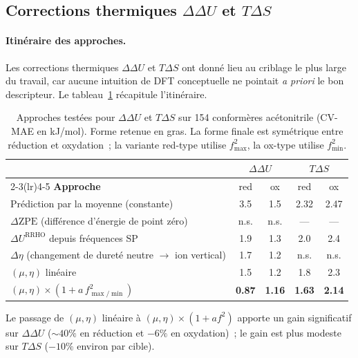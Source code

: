 \subsection{Corrections thermiques \texorpdfstring{$\Delta\Delta U$}{ddU} et \texorpdfstring{$T\Delta S$}{TdS}}
\label{app:thermal_search}

\paragraph{Itinéraire des approches.}
Les corrections thermiques $\Delta\Delta U$ et $T\Delta S$ ont donné lieu au criblage le plus large du travail, car aucune intuition de DFT conceptuelle ne pointait \emph{a priori} le bon descripteur. Le tableau~\ref{tab:app_thermal_journey} récapitule l'itinéraire.

\begin{table}[H]
\centering
\caption{Approches testées pour $\Delta\Delta U$ et $T\Delta S$ sur 154 conformères acétonitrile (CV-MAE en kJ/mol). Forme retenue en gras. La forme finale est symétrique entre réduction et oxydation~; la variante red-type utilise $f^2_{\max}$, la ox-type utilise $f^2_{\min}$.}
\label{tab:app_thermal_journey}
\footnotesize
\begin{tabular}{l c c c c}
\toprule
 & \multicolumn{2}{c}{$\Delta\Delta U$} & \multicolumn{2}{c}{$T\Delta S$} \\
\cmidrule(lr){2-3}\cmidrule(lr){4-5}
\textbf{Approche} & red & ox & red & ox \\
\midrule
Prédiction par la moyenne (constante) & 3.5 & 1.5 & 2.32 & 2.47 \\
$\Delta\text{ZPE}$ (différence d'énergie de point zéro) & n.s. & n.s. & --- & --- \\
$\Delta U^\text{RRHO}$ depuis fréquences SP & 1.9 & 1.3 & 2.0 & 2.4 \\
$\Delta\eta$ (changement de dureté neutre $\to$ ion vertical) & 1.7 & 1.2 & n.s. & n.s. \\
$(\mu, \eta)$ linéaire & 1.5 & 1.2 & 1.8 & 2.3 \\
\textbf{$(\mu, \eta) \times (1 + a\, f^2_{\max/\min})$} & \textbf{0.87} & \textbf{1.16} & \textbf{1.63} & \textbf{2.14} \\
\bottomrule
\end{tabular}
\end{table}

Le passage de $(\mu, \eta)$ linéaire à $(\mu, \eta) \times (1 + a f^2)$ apporte un gain significatif sur $\Delta\Delta U$ ($\sim 40\%$ en réduction et $-6\%$ en oxydation)~; le gain est plus modeste sur $T\Delta S$ ($-10\%$ environ par cible).

